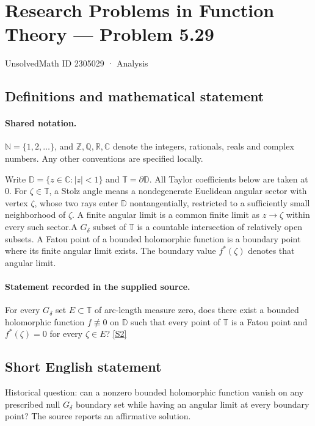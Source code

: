 \documentclass[11pt]{article}
\newcommand{\sref}[2]{\hyperlink{source:#1:#2}{[S#2]}}
\begin{document}
\setcounter{section}{2305028}
\section{Research Problems in Function Theory — Problem 5.29}\label{2305029}
{\small\sffamily UnsolvedMath ID 2305029 · Analysis}
\subsection{Definitions and mathematical statement}

\paragraph{Shared notation.}$\mathbb N=\{1,2,\ldots\}$, and $\mathbb Z,\mathbb Q,\mathbb R,\mathbb C$ denote the integers, rationals, reals and complex numbers. Any other conventions are specified locally.


Write $\mathbb D=\{z\in\mathbb C:|z|<1\}$ and $\mathbb T=\partial\mathbb D$. All Taylor coefficients below are taken at $0$. For $\zeta\in\mathbb T$, a Stolz angle means a nondegenerate Euclidean angular sector with vertex $\zeta$, whose two rays enter $\mathbb D$ nontangentially, restricted to a sufficiently small neighborhood of $\zeta$. A finite angular limit is a common finite limit as $z\to\zeta$ within every such sector.A $G_\delta$ subset of $\mathbb T$ is a countable intersection of relatively open subsets. A Fatou point of a bounded holomorphic function is a boundary point where its finite angular limit exists. The boundary value $f^*(\zeta)$ denotes that angular limit.
\paragraph{Statement recorded in the supplied source.}
For every $G_\delta$ set $E\subset\mathbb T$ of arc-length measure zero, does there exist a bounded holomorphic function $f\not\equiv0$ on $\mathbb D$ such that every point of $\mathbb T$ is a Fatou point and $f^*(\zeta)=0$ for every $\zeta\in E$? \sref{2305029}{2}
\subsection{Short English statement}
Historical question: can a nonzero bounded holomorphic function vanish on any prescribed null $G_\delta$ boundary set while having an angular limit at every boundary point? The source reports an affirmative solution.
\end{document}
